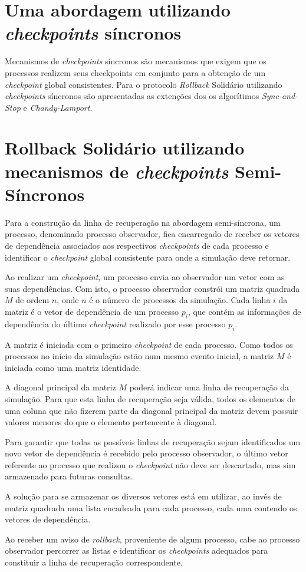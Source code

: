 \section{Uma abordagem utilizando \textit{checkpoints} síncronos}
	Mecanismos de \textit{checkpoints} síncronos são mecanismos que exigem que os processos realizem seus checkpoints em conjunto para a obtenção de um \textit{checkpoint} global consistentes.	 Para o protocolo \textit{Rollback} Solidário utilizando \textit{checkpoints} síncronos são apresentadas as extenções dos os algorítimos \textit{Sync-and-Stop}\cite{Plank93}  e \textit{Chandy-Lamport}\cite{ChandyLamport}.


\section{Rollback Solidário utilizando mecanismos de \textit{checkpoints} Semi-Síncronos}

	Para a construção da linha de recuperação na abordagem semi-síncrona, um processo, denominado processo observador, fica encarregado de receber os vetores de dependência associados aos respectivos \textit{checkpoints} de cada processo e identificar o \textit{checkpoint} global consistente para onde a simulação deve retornar.

	Ao realizar um \textit{checkpoint}, um processo envia ao observador um vetor com as suas dependências. Com isto, o processo observador constrói um matriz quadrada $M$ de ordem $n$, onde $n$ é o número de processos da simulação. Cada linha $i$ da matriz é o vetor de dependência de um processo $p_i$, que contém as informações de dependência do último \textit{checkpoint} realizado por esse processo $p_i$. 

	A matriz é iniciada com o primeiro \textit{checkpoint} de cada processo. Como todos os processos no início da simulação estão num mesmo evento inicial, a matriz $M$ é iniciada como uma matriz identidade.

	A diagonal principal da matriz $M$ poderá indicar uma linha de recuperação da simulação. Para que esta linha de recuperação seja válida, todos os elementos de uma coluna que não fizerem parte da diagonal principal da matriz devem possuir valores menores do que o elemento pertencente à diagonal.  

	Para garantir que todas as possíveis linhas de recuperação sejam identificados um novo vetor de dependência é recebido pelo processo observador, o último vetor referente ao processo que realizou o \textit{checkpoint} não deve ser descartado, mas sim armazenado para futuras consultas.

	A solução para se armazenar os diversos vetores está em utilizar, ao invés de matriz quadrada uma lista encadeada para cada processo, cada uma contendo os vetores de dependência.

	Ao receber um aviso de \textit{rollback}, proveniente de algum processo, cabe ao processo observador percorrer as listas e identificar os \textit{checkpoints} adequados para constituir a linha de recuperação correspondente.
	
	